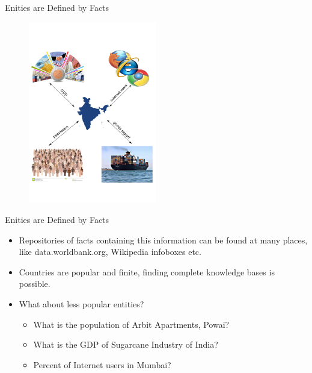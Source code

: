 \documentclass{beamer}
\begin{document}
\begin{frame}{Enities are Defined by Facts}

    \begin{figure}
    \centering
    \includegraphics[width = 0.5\textwidth]{images/motivation}
  \end{figure}
 
\end{frame}


\begin{frame}{Enities are Defined by Facts}
 
 \begin{itemize}
  \item Repositories of facts containing this information can be found at many places, like data.worldbank.org, Wikipedia infoboxes etc. 
  \item Countries are popular and finite, finding complete knowledge bases is possible. 
  \item What about less popular entities?  
    \begin{itemize}
      \item What is the population of Arbit Apartments, Powai?
      \item What is the GDP of Sugarcane Industry of India?
      \item Percent of Internet users in Mumbai? 
    \end{itemize}
 \end{itemize} 
\end{frame}
\end{document}
